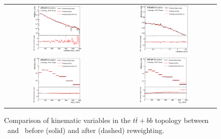\begin{figure}[p]
\begin{center}
\begin{tabular}{cc}
\includegraphics[width=0.48\textwidth]{Modeling/Figures/rw_ttbb_q1_pt.eps} &
\includegraphics[width=0.48\textwidth]{Modeling/Figures/rw_ttbb_q1_eta.eps} \\
\includegraphics[width=0.48\textwidth]{Modeling/Figures/rw_ttbb_top_pt.eps} &
\includegraphics[width=0.48\textwidth]{Modeling/Figures/rw_ttbb_ttbar_pt.eps} \\
\end{tabular}
\caption{Comparison of kinematic variables in the $t\bar{t}+bb$ topology between \ShOL\ and \PP\ before (solid) and after (dashed) reweighting.}
\label{fig:default_tt2b_rw}
\end{center}
\end{figure}
